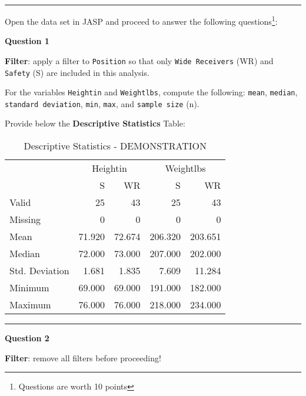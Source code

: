 \documentclass[11pt,]{article}
\begin{document}
\begin{center}\rule{0.5\linewidth}{0.5pt}\end{center}

Open the data set in JASP and proceed to answer the following
questions\footnote{Questions are worth 10 points}:

\textbf{Question 1}

\textbf{Filter}: apply a filter to \texttt{Position} so that only
\texttt{Wide\ Receivers} (WR) and \texttt{Safety} (S) are included in
this analysis.

For the variables \texttt{Heightin} and \texttt{Weightlbs}, compute the
following: \texttt{mean}, \texttt{median}, \texttt{standard\ deviation},
\texttt{min}, \texttt{max}, and \texttt{sample\ size} (n).

Provide below the \textbf{Descriptive Statistics} Table:

\begin{table}[h]
    \centering
    \caption{Descriptive Statistics - DEMONSTRATION}
    \label{tab:descriptiveStatistics}
    {
        \begin{tabular}{lrrrr}
            \toprule
            \multicolumn{1}{c}{} & \multicolumn{2}{c}{Heightin} & \multicolumn{2}{c}{Weightlbs} \\
            \cline{2-3}\cline{4-5}
             & S & WR & S & WR  \\
            \cmidrule[0.4pt]{1-5}
            Valid & 25 & 43 & 25 & 43  \\
            Missing & 0 & 0 & 0 & 0  \\
            Mean & 71.920 & 72.674 & 206.320 & 203.651  \\
            Median & 72.000 & 73.000 & 207.000 & 202.000  \\
            Std. Deviation & 1.681 & 1.835 & 7.609 & 11.284  \\
            Minimum & 69.000 & 69.000 & 191.000 & 182.000  \\
            Maximum & 76.000 & 76.000 & 218.000 & 234.000  \\
            \bottomrule
        \end{tabular}
    }
\end{table}

\begin{center}\rule{0.5\linewidth}{0.5pt}\end{center}

\textbf{Question 2}

\textbf{Filter}: remove all filters before proceeding!
\end{document}
